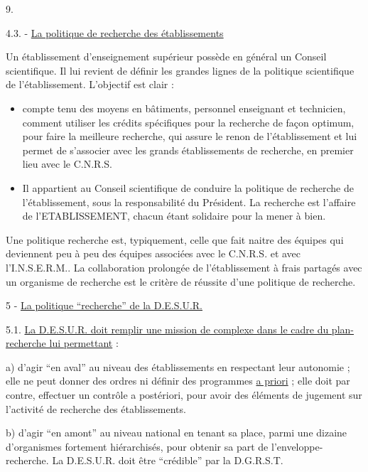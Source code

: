 
9.

4.3. - \uline{La politique de recherche des établissements}

Un établissement d'enseignement supérieur possède en général un Conseil scientifique. Il lui revient de définir les grandes lignes de la politique scientifique de l'établissement. L'objectif est clair :

\begin{itemize}
\item[-] compte tenu des moyens en bâtiments, personnel enseignant et technicien, comment utiliser les crédits spécifiques pour la recherche de façon optimum, pour faire la meilleure recherche,  qui assure le renon de l'établissement et lui permet de s'associer avec les grands établissements de recherche, en premier lieu avec le C.N.R.S.
\item[-] Il appartient au Conseil scientifique de conduire la politique de recherche de l'établissement, sous la responsabilité du Président. La recherche est l'affaire de l'ETABLISSEMENT, chacun étant solidaire pour la mener à bien.
\end{itemize}

Une politique recherche est, typiquement, celle que fait naitre des équipes qui deviennent peu à peu des équipes associées avec le C.N.R.S. et avec l'I.N.S.E.R.M.. La collaboration prolongée de l'établissement à frais partagés avec un organisme de recherche est le critère de réussite d'une politique de recherche.

5 - \uline{La politique ``recherche'' de la D.E.S.U.R.}

5.1. \uline{La D.E.S.U.R. doit remplir une mission de complexe dans le cadre du plan-recherche lui permettant} :

a) d'agir ``en aval'' au niveau des établissements en respectant leur autonomie ; elle ne peut donner des ordres ni définir des programmes \uline{a priori} ; elle doit par contre, effectuer un contrôle a postériori, pour avoir des éléments de jugement sur l'activité de recherche des établissements.

b) d'agir ``en amont'' au niveau national en tenant sa place, parmi une dizaine d'organismes fortement hiérarchisés, pour obtenir sa part de l'enveloppe-recherche. La D.E.S.U.R. doit être ``crédible'' par la D.G.R.S.T.


